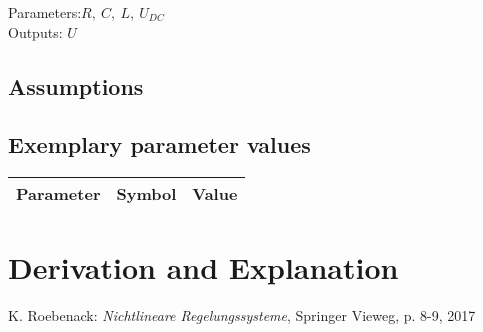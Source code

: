 \documentclass[10pt,a4paper]{article}
\begin{document}
	
	\noindent
	Parameters:$ R, ~C, ~L, ~U_{DC}$ %
	\\
	Outputs: $U$ %
	
	
	\subsection{Assumptions} %

	
	
	\subsection{Exemplary parameter values}
	\begin{tabular}{lcl} 
		Parameter & Symbol & Value \\ \hline	
	\end{tabular}

	
	\section{Derivation and Explanation} %
	
	
	\begin{thebibliography}{10}		
		K. Roebenack: 
		\textit{Nichtlineare Regelungssysteme}, Springer Vieweg, p. 8-9, 2017
	\end{thebibliography}
\end{document}
